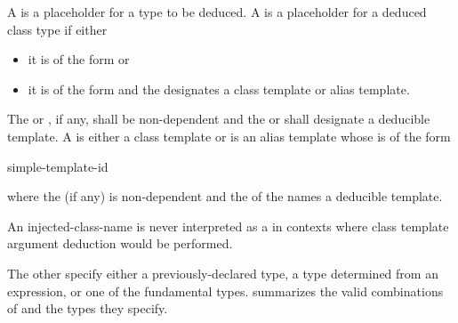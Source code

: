 \pnum
{}%
%
%
%
%
%
%
%
%
%
%
%
%
%
%
%
A 
is a placeholder for
a type to be deduced.
%
A  is a placeholder for
a deduced class type if either
\begin{itemize}
\item
it is of the form
   or
\item
it is of the form   and
the  designates
a class template or alias template.
\end{itemize}
The  or ,
if any, shall be non-dependent and
the  or 
shall designate a deducible template.
A  is either a class template or
is an alias template whose  is of the form

\begin{ncsimplebnf}
   simple-template-id
\end{ncsimplebnf}

where the  (if any) is non-dependent and
the  of the 
names a deducible template.
\begin{note}
An injected-class-name is never interpreted as a 
in contexts where class template argument deduction would be performed.
\end{note}
The other
specify either a previously-declared type, a type determined from an
expression, or one of the
fundamental types.
 summarizes the valid combinations of
and the types they specify.

